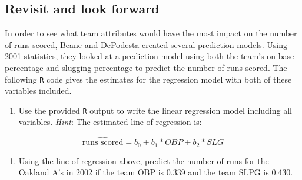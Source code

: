 \documentclass[
]{report}
\newenvironment{Shaded}{\begin{snugshade}}{\end{snugshade}}
\newcommand{\CommentTok}[1]{\textcolor[rgb]{0.56,0.35,0.01}{\textit{#1}}}
\newcommand{\DataTypeTok}[1]{\textcolor[rgb]{0.13,0.29,0.53}{#1}}
\newcommand{\DecValTok}[1]{\textcolor[rgb]{0.00,0.00,0.81}{#1}}
\newcommand{\KeywordTok}[1]{\textcolor[rgb]{0.13,0.29,0.53}{\textbf{#1}}}
\newcommand{\NormalTok}[1]{#1}
\newcommand{\OperatorTok}[1]{\textcolor[rgb]{0.81,0.36,0.00}{\textbf{#1}}}
\newcommand{\StringTok}[1]{\textcolor[rgb]{0.31,0.60,0.02}{#1}}
\providecommand{\tightlist}{%
  \setlength{\itemsep}{0pt}\setlength{\parskip}{0pt}}
\begin{document}
\hypertarget{revisit-and-look-forward}{%
\subsection*{Revisit and look forward}\label{revisit-and-look-forward}}

In order to see what team attributes would have the most impact on the number of runs scored, Beane and DePodesta created several prediction models. Using 2001 statistics, they looked at a prediction model using both the team's on base percentage and slugging percentage to predict the number of runs scored. The following \texttt{R} code gives the estimates for the regression model with both of these variables included.

\begin{Shaded}
\end{Shaded}

\begin{enumerate}
\def\labelenumi{\arabic{enumi}.}
\setcounter{enumi}{20}
\tightlist
\item
  Use the provided \texttt{R} output to write the linear regression model including all variables. \emph{Hint}: The estimated line of regression is:
\end{enumerate}

\[\widehat{\text{runs scored}} = b_0 + b_1*OBP + b_2*SLG\]

\vspace{1in}

\begin{enumerate}
\def\labelenumi{\arabic{enumi}.}
\setcounter{enumi}{21}
\tightlist
\item
  Using the line of regression above, predict the number of runs for the Oakland A's in 2002 if the team OBP is 0.339 and the team SLPG is 0.430.
\end{enumerate}
\end{document}
